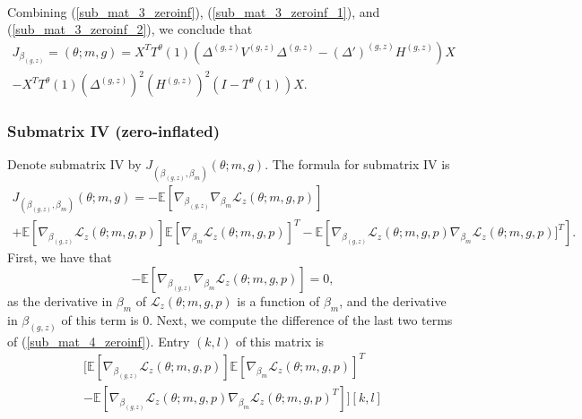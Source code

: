 \documentclass[12pt]{article}
\begin{document}
\begin{appendices}
\begin{refsection}
\begin{multline}
		\end{multline}
		Combining (\ref{sub_mat_3_zeroinf}), (\ref{sub_mat_3_zeroinf_1}), and (\ref{sub_mat_3_zeroinf_2}), we conclude that
		\begin{multline}\label{sub_mat_3_zeroinf_formula}
		J_{\beta_{(g, z)}} = \left( \theta; m, g \right) =  X^T T^{\theta}(1) ( \Delta^{(g,z)}V^{(g,z)}\Delta^{(g,z)} - (\Delta')^{(g,z)} H^{(g,z)}) X \\ - X^T T^{\theta}(1) \left(\Delta^{(g,z)}\right)^2 \left( H^{(g,z)} \right)^2 \left( I - T^{\theta}(1) \right) X.
		\end{multline}
		
		\subsubsection*{Submatrix IV (zero-inflated)}
		Denote submatrix IV by $J_{(\beta_{(g,z)}, \beta_m)}(\theta; m, g)$. The formula for submatrix IV is
		\begin{multline}\label{sub_mat_4_zeroinf}
		J_{(\beta_{(g,z)}, \beta_m)}(\theta; m, g) = - \mathbb{E} \left[\nabla_{\beta_{(g,z)}} \nabla_{\beta_m} \mathcal{L}_z (\theta; m, g, p) \right] \\ + \mathbb{E}\left[ \nabla_{\beta_{(g,z)} }\mathcal{L}_z(\theta ; m,g,p) \right]\mathbb{E}\left[\nabla_{\beta_m}\mathcal{L}_z(\theta; m,g,p)\right]^T - \mathbb{E} \left[\nabla_{\beta_{(g,z)}}\mathcal{L}_z (\theta; m,g,p) \nabla_{\beta_m}\mathcal{L}_z(\theta; m,g,p)]^T \right].
		\end{multline} 
		First, we have that
		\begin{equation}\label{sub_mat_4_zeroinf_1}
		- \mathbb{E} \left[\nabla_{\beta_{(g,z)}} \nabla_{\beta_m} \mathcal{L}_z (\theta; m, g, p) \right] = 0,
		\end{equation}
		as the derivative in $\beta_m$ of $\mathcal{L}_z(\theta; m, g, p)$ is a function of $\beta_m$, and the derivative in $\beta_{(g,z)}$ of this term is $0$. Next, we compute the difference of the last two terms of (\ref{sub_mat_4_zeroinf}). Entry $(k,l)$ of this matrix is
		\begin{multline}\label{sub_mat_4_zeroinf_2}
		[\mathbb{E}[\nabla_{\beta_{(g,z)}}\mathcal{L}_z(\theta; m, g, p) ] \mathbb{E} [\nabla_{\beta_m} \mathcal{L}_z(\theta; m, g, p) ]^T \\ - \mathbb{E} [\nabla_{\beta_{(g,z)}} \mathcal{L}_z(\theta; m, g, p) \nabla_{\beta_m}\mathcal{L}_z(\theta; m, g, p)^T ] ][k,l] \\ 

\end{multline}
\end{refsection}
\end{appendices}
\end{document}
